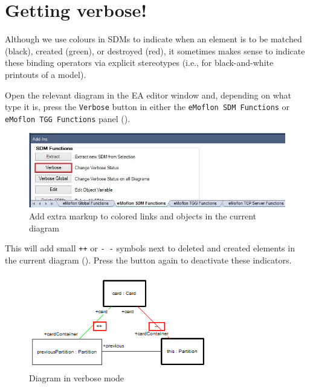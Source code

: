 \section{Getting verbose!}

Although we use colours in SDMs to indicate when an element is to be matched (black), created (green), or destroyed (red), it sometimes makes sense to
indicate these binding operators via explicit stereotypes (i.e., for black-and-white printouts of a model).

\begin{stepbystep}
  
\item Open the relevant diagram in the EA editor window and, depending on what type it is, press the \texttt{Verbose} button in
either the \texttt{eMoflon SDM Functions} or \texttt{eMoflon TGG Functions} panel ().

\vspace{0.5cm}

\begin{figure}[htbp]
\begin{center}
  \includegraphics[width=\textwidth]{../../org.moflon.doc.handbook.05_miscellaneous/1_grokkingEA/05_verbose/ea_changeVerboseStatus}
  \caption{Add extra markup to colored links and objects in the current diagram}  
  \label{ea:changeVStatus}
\end{center}
\end{figure}

\item This will add small \texttt{++} or \texttt{-~-} symbols next to deleted and created elements in the current diagram
(). Press the button again to deactivate these indicators.

\begin{figure}[htbp]
\begin{center}
  \includegraphics[width=0.7\textwidth]{../../org.moflon.doc.handbook.05_miscellaneous/1_grokkingEA/05_verbose/ea_verboseSymbols}
  \caption{Diagram in verbose mode}  
  \label{ea:verboseSymbols}
\end{center}
\end{figure}

\end{stepbystep}
